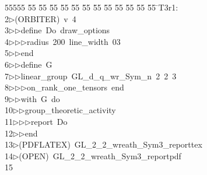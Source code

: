 %
%
\begin{tabbing}
55555 \= 55 \= 55 \= 55 \= 55 \= 55 \= 55 \= 55 \= 55 \= 55 \= 55 \= 55 \= 55 \= \>T3r1:\\[0pt]
2\>$\triangleright$\>(ORBITER)\ v\ 4\ \\[0pt]
3\>$\triangleright$\>$\triangleright$\>define\ Do\ draw\_options\ \\[0pt]
4\>$\triangleright$\>$\triangleright$\>$\triangleright$\>radius\ 200\ line\_width\ 03\ \\[0pt]
5\>$\triangleright$\>$\triangleright$\>end\ \\[0pt]
6\>$\triangleright$\>$\triangleright$\>define\ G\ \\[0pt]
7\>$\triangleright$\>$\triangleright$\>linear\_group\ GL\_d\_q\_wr\_Sym\_n\ 2\ 2\ 3\ \\[0pt]
8\>$\triangleright$\>$\triangleright$\>$\triangleright$\>on\_rank\_one\_tensors\ end\ \\[0pt]
9\>$\triangleright$\>$\triangleright$\>with\ G\ do\ \\[0pt]
10\>$\triangleright$\>$\triangleright$\>group\_theoretic\_activity\ \\[0pt]
11\>$\triangleright$\>$\triangleright$\>$\triangleright$\>report\ Do\ \\[0pt]
12\>$\triangleright$\>$\triangleright$\>end\\[0pt]
13\>$\triangleright$\>(PDFLATEX)\ GL\_2\_2\_wreath\_Sym3\_reporttex\\[0pt]
14\>$\triangleright$\>(OPEN)\ GL\_2\_2\_wreath\_Sym3\_reportpdf\\[0pt]
15\>\end{tabbing}
